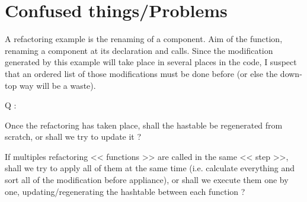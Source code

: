 \documentclass{article}
\begin{document}
\section{Confused things/Problems}
A refactoring example is the renaming of a component. Aim of the function, renaming a component at its declaration and calls.
Since the modification generated by this example will take place in several places in the code, I suspect that an ordered list of those modifications must be done before (or else the down-top way will be a waste). 

Q : 

Once the refactoring has taken place, shall the hastable be regenerated from scratch, or shall we try to update it ?

If multiples refactoring << functions >> are called in the same << step >>, shall we try to apply all of them at the same time (i.e. calculate everything and sort all of the modification before appliance), or shall we execute them one by one, updating/regenerating the hashtable between each function ?
\end{document}
